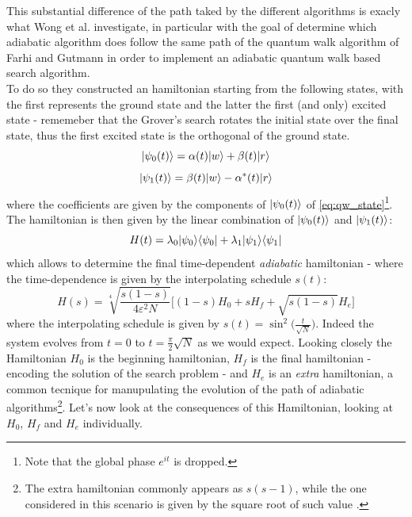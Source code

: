 \noindent
This substantial difference of the path taked by the different algorithms is exacly what Wong et al. investigate, in particular with the goal of determine which adiabatic algorithm does follow the same path of the quantum walk algorithm of Farhi and Gutmann in order to implement an adiabatic quantum walk based search algorithm. \\

\noindent
To do so they constructed an hamiltonian starting from the following states, with the first represents the ground state and the latter the first (and only) excited state - rememeber that the Grover's search rotates the initial state over the final state, thus the first excited state is the orthogonal of the ground state.
\begin{equation}
  {|{\psi_0(t)}\rangle} = \alpha(t){|{w}\rangle} + \beta(t){|{r}\rangle}
\end{equation}
\vspace{-0.5cm}
\begin{equation}
  {|{\psi_1(t)}\rangle} = \beta(t){|{w}\rangle} - \alpha^*(t){|{r}\rangle}
\end{equation}
where the coefficients are given by the components of ${|{\psi_0(t)}\rangle}$ of \cref{eq:qw_state}\footnote{Note that the global phase $e^{it}$ is dropped.}.
The hamiltonian is then given by the linear combination of ${|{\psi_0(t)}\rangle}$ and ${|{\psi_1(t)}\rangle}$:
\begin{equation}
  H(t) = \lambda_0{|{\psi_0}\rangle}{\langle{\psi_0}|} + \lambda_1{|{\psi_1}\rangle}{\langle{\psi_1}|}
\end{equation}
which allows to determine the final time-dependent \textit{adiabatic} hamiltonian - where the time-dependence is given by the interpolating schedule $s(t)$:
\begin{equation}
  H(s) = \sqrt[4]{\frac{s(1-s)}{4\varepsilon^2N}}\Big[ (1-s)H_0 + sH_f + \sqrt{s(1-s)}H_e\Big]
\end{equation}
where the interpolating schedule is given by $s(t)=\sin^2\big(\frac{t}{\sqrt{N}}\big)$. Indeed the system evolves from $t=0$ to $t=\frac{\pi}{2}\sqrt{N}$ as we would expect. Looking closely the Hamiltonian $H_0$ is the beginning hamiltonian, $H_f$ is the final hamiltonian - encoding the solution of the search problem - and $H_e$ is an \textit{extra} hamiltonian, a common tecnique for manupulating the evolution of the path of adiabatic algorithms\footnote{The extra hamiltonian commonly appears as $s(s-1)$, while the one considered in this scenario is given by the square root of such value \cite{Wong2016}.}. Let's now look at the consequences of this Hamiltonian, looking at $H_0$, $H_f$ and $H_e$ individually. \\
